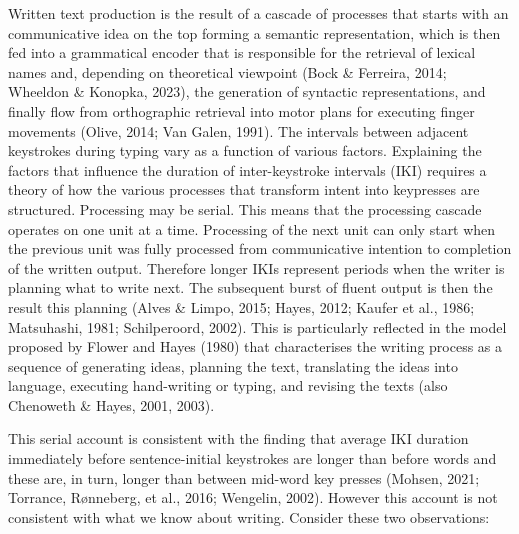\documentclass[
  english,
  man,floatsintext]{apa7}
\begin{document}
Written text production is the result of a cascade of processes that starts with an communicative idea on the top forming a semantic representation, which is then fed into a grammatical encoder that is responsible for the retrieval of lexical names and, depending on theoretical viewpoint (Bock \& Ferreira, 2014; Wheeldon \& Konopka, 2023), the generation of syntactic representations, and finally flow from orthographic retrieval into motor plans for executing finger movements (Olive, 2014; Van Galen, 1991). The intervals between adjacent keystrokes during typing vary as a function of various factors. Explaining the factors that influence the duration of inter-keystroke intervals (IKI) requires a theory of how the various processes that transform intent into keypresses are structured. Processing may be serial. This means that the processing cascade operates on one unit at a time. Processing of the next unit can only start when the previous unit was fully processed from communicative intention to completion of the written output. Therefore longer IKIs represent periods when the writer is planning what to write next. The subsequent burst of fluent output is then the result this planning (Alves \& Limpo, 2015; Hayes, 2012; Kaufer et al., 1986; Matsuhashi, 1981; Schilperoord, 2002). This is particularly reflected in the model proposed by Flower and Hayes (1980) that characterises the writing process as a sequence of generating ideas, planning the text, translating the ideas into language, executing hand-writing or typing, and revising the texts (also Chenoweth \& Hayes, 2001, 2003).

This serial account is consistent with the finding that average IKI duration immediately before sentence-initial keystrokes are longer than before words and these are, in turn, longer than between mid-word key presses (Mohsen, 2021; Torrance, Rønneberg, et al., 2016; Wengelin, 2002). However this account is not consistent with what we know about writing. Consider these two observations:
\end{document}
